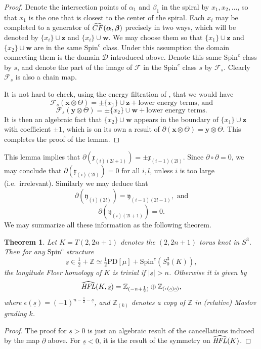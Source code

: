 \documentclass{gtart_h}
\newtheorem{thm}{Theorem}[section]
\theoremstyle{definition}
\newcommand{\us}{\underline{s}}
\newcommand\x{\mathbf x}
\newcommand\w{\mathbf w}
\newcommand\z{\mathbf z}
\newcommand\y{\mathbf y}
\newcommand{\sD}{\mathcal{D}}
\newcommand\sF{\mathcal{F}}
\newcommand\HFLhat{\widehat{\HFL}}
\newcommand\alphas{\mbox{\boldmath$\alpha$}}
\newcommand\betas{\mbox{\boldmath$\beta$}}
\newcommand\HFL{\text{\it HFL\/}}
\newcommand{\Z}{\mathbb{Z}}
\newcommand{\SpinC}{{\mathrm{Spin}}^c}
\begin{document}
\begin{proof}
Denote the intersection points of $\alpha_1$ and $\beta_1$ in the spiral by
$x_1,x_2,\ldots$, so that $x_1$ is the one that is closest to the center of the spiral.
Each $x_i$ may be completed to a generator of
$\widehat{CF}(\alphas,\betas)$ precisely in two ways,
which will be denoted  by $\{x_i\}\cup \z$ and $\{x_i\}\cup \w$. We may choose them so
that $\{x_1\}\cup \z$ and $\{x_2\}\cup\w$ are in the same $\SpinC$ class. Under this
assumption the domain connecting them is the domain
$\sD$ introduced above. Denote this same $\SpinC$
class by $s$, and denote the part of the image of $\sF$ in the $\SpinC$ class $s$ by
$\sF_s$. Clearly $\sF_s$ is also a chain map.

It is not hard to check, using the energy filtration of \cite{OS-3m2}, that
we would have
$$\sF_s(\x\otimes \Theta)=\pm \{x_1\}\cup \z + \text{lower energy terms, and}$$
$$\sF_s(\y\otimes \Theta)=\pm \{x_2\}\cup \w +\text{lower energy terms}.$$
It is then an algebraic fact that $\{x_2\}\cup \w$ appears in the boundary of
$\{x_1\}\cup \z$ with coefficient $\pm 1$, which is on its own a result of
$\partial(\x \otimes \Theta)=\y \otimes \Theta$.
This completes the proof of the lemma.
\end{proof}

This lemma implies that $\partial(\mathfrak{x}_{(i)(2l+1)})=
\pm \mathfrak{x}_{(i-1)(2l)}$.
Since $\partial \circ \partial=0$, we may conclude that
$\partial (\mathfrak{x}_{(i)(2l)})=0$ for all $i,l$, unless $i$ is too large
(i.e.\ irrelevant). Similarly we may deduce that
$$\partial(\mathfrak{y}_{(i)(2l)})=\mathfrak{y}_{(i-1)(2l-1)},\text{ and}$$
$$\partial(\mathfrak{y}_{(i)(2l+1)})=0.$$
We may summarize all these information as the following theorem.

\begin{thm}
Let $K=T(2,2n+1)$ denotes the $(2,2n+1)$ torus knot in $S^3$. Then for any $\SpinC$
structure $$\us\in\tfrac{1}{2}+\Z\simeq \tfrac{1}{2}\text{PD}[\mu]+\SpinC(S^3_0(K)),$$
the longitude Floer homology of $K$ is trivial if $|\us|>n$. Otherwise it is given by
$$\HFLhat(K,\us)=\Z_{(-n+\frac{1}{2})}\oplus \Z_{(\epsilon(\us)\us)},$$
where $\epsilon(\us)=(-1)^{n-\frac{1}{2}-\us}$, and $\Z_{(k)}$ denotes a copy of $\Z$ in
(relative) Maslov grading $k$.
\end{thm}
\begin{proof}
The proof for $\us>0$ is just an algebraic result of the cancellations induced by the
map $\partial$ above. For $\us<0$, it is the result of the symmetry on $\HFLhat(K)$.
\end{proof}
\end{document}
